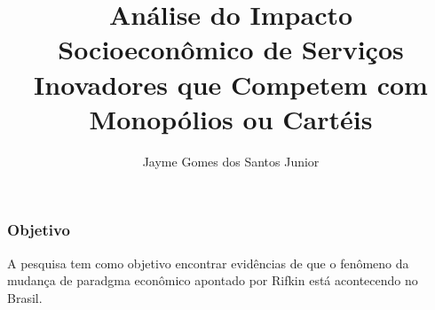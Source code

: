 \documentclass{beamer}
\title[Estatística Aplicada a Geopolítica]{Análise do Impacto Socioeconômico de Serviços Inovadores que Competem com Monopólios ou Cartéis} %
\author{Jayme Gomes dos Santos Junior}
\institute[Universidade Federal do Paraná] 
{
  \inst{}%
  Paulo Afonso Bracarense Costa\\
  Orientador
  }
\date{}
\begin{document}


\begin{frame}
\titlepage %
\end{frame}






\begin{frame}
\frametitle{Objetivo}
\begin{block}

A pesquisa tem como objetivo encontrar evidências
de que o fenômeno da mudança de paradgma econômico
apontado por Rifkin está acontecendo no Brasil.
\end{block}
\end{frame}

\end{document}
